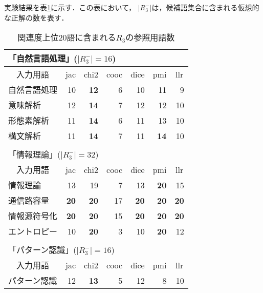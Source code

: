 実験結果を\mbox{表\ref{tbl:rel_result}}に示す．この表において，
$|R_3^{-}|$は，候補語集合に含まれる仮想的な正解の数を表す．

\begin{table}
 \begin{center}\footnotesize
  \caption{関連度上位20語に含まれる$R_3$の参照用語数}\label{tbl:rel_result}
  \begin{tabular}{|l|rr|rrrr|}
   \multicolumn{7}{l}{「自然言語処理」($|R_3^{-}|=16$)}\\
   \hline
   \multicolumn{1}{|c}{入力用語} & 
   \multicolumn{1}{|c}{jac} &
   \multicolumn{1}{c}{chi2} &
   \multicolumn{1}{|c}{cooc} &
   \multicolumn{1}{c}{dice} &
   \multicolumn{1}{c}{pmi} &
   \multicolumn{1}{c|}{llr} \\
   \hline
   自然言語処理 & 10 & {\bf 12} & 6 & 10 & 11 & 9 \\
   意味解析 & 12 & {\bf 14} & 7 & 12 & 12 & 10 \\
   形態素解析 & 11 & {\bf 14} & 6 & 11 & 13 & 10 \\
   構文解析 & 11 & {\bf 14} & 7 & 11 & {\bf 14} & 10 \\
   \hline
   \multicolumn{7}{l}{\tiny }\\[-5pt]
   \multicolumn{7}{l}{「情報理論」($|R_3^{-}|=32$)}\\
   \hline
   \multicolumn{1}{|c}{入力用語} & 
   \multicolumn{1}{|c}{jac} &
   \multicolumn{1}{c}{chi2} &
   \multicolumn{1}{|c}{cooc} &
   \multicolumn{1}{c}{dice} &
   \multicolumn{1}{c}{pmi} &
   \multicolumn{1}{c|}{llr} \\
   \hline
   情報理論 & 13 & 19 & 7 & 13 & {\bf 20} & 15 \\
   通信路容量 & {\bf 20} & {\bf 20} & 17 & {\bf 20} & {\bf 20} & {\bf 20} \\
   情報源符号化 & {\bf 20} & {\bf 20} & 15 & {\bf 20} & {\bf 20} & {\bf 20} \\
   エントロピー & 10 & {\bf 20} & 3 & 10 & {\bf 20} & 12 \\
   \hline
   \multicolumn{7}{l}{\tiny }\\[-5pt]
   \multicolumn{7}{l}{「パターン認識」($|R_3^{-}|=16$)}\\
   \hline
   \multicolumn{1}{|c}{入力用語} & 
   \multicolumn{1}{|c}{jac} &
   \multicolumn{1}{c}{chi2} &
   \multicolumn{1}{|c}{cooc} &
   \multicolumn{1}{c}{dice} &
   \multicolumn{1}{c}{pmi} &
   \multicolumn{1}{c|}{llr} \\
   \hline
   パターン認識 & 12 & {\bf 13} & 5 & 12 & 8 & 10 \\

\end{tabular}
\end{center}
\end{table}
